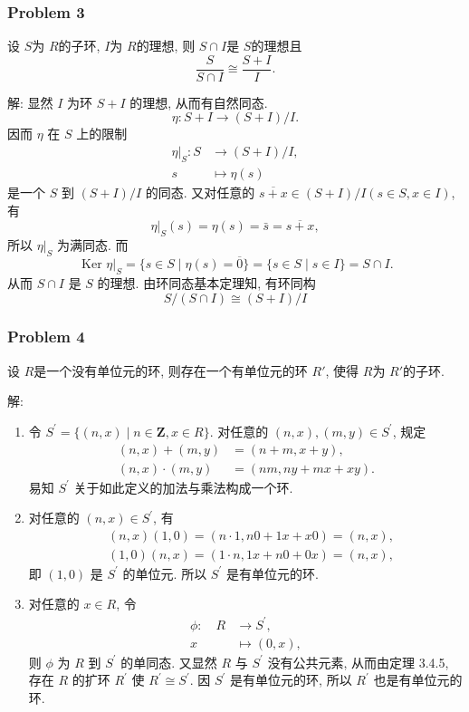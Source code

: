 \documentclass[a4paper,12pt]{ctexart}
\begin{document}
\subsubsection*{Problem 3}
    设 $ S $为 $ R $的子环, $ I $为 $ R $的理想, 则 $ S\cap I $是 $ S $的理想且 
    \[\frac{S}{S\cap I}\cong \frac{S+I}{I}.\]

    解: 
    显然 $I$ 为环 $S+I$ 的理想, 从而有自然同态.
    $$
    \eta: S+I \longrightarrow(S+I) / I .
    $$
    因而 $\eta$ 在 $S$ 上的限制
    $$
    \begin{aligned}
    \left.\eta\right|_S: S & \longrightarrow(S+I) / I, \\
    s & \longmapsto \eta(s)
    \end{aligned}
    $$
    是一个 $S$ 到 $(S+I) / I$ 的同态.
    又对任意的 $\overline{s+x} \in(S+I) / I(s \in S, x \in I)$, 有
    $$
    \left.\eta\right|_S(s)=\eta(s)=\bar{s}=\overline{s+x},
    $$
    所以 $\left.\eta\right|_S$ 为满同态. 而
    $$
    \text { Ker }\left.\eta\right|_S=\{s \in S \mid \eta(s)=\overline{0}\}=\{s \in S \mid s \in I\}=S \cap I .
    $$
    从而 $S \cap I$ 是 $S$ 的理想. 由环同态基本定理知, 有环同构
    $$
    S /(S \cap I) \cong(S+I) / I
    $$

\subsubsection*{Problem 4}
    设 $ R $是一个没有单位元的环, 则存在一个有单位元的环 $ R' $, 使得 $ R $为 $ R' $的子环.
    
    解: 
    \begin{enumerate}[label=(\arabic{*})]
      \item  令 $S^{\prime}=\{(n, x) \mid n \in \mathbf{Z}, x \in R\}$. 对任意的 $(n, x),(m, y) \in S^{\prime}$, 规定
$$
\begin{aligned}
(n, x)+(m, y) &=(n+m, x+y), \\
(n, x) \cdot(m, y) &=(n m, n y+m x+x y) .
\end{aligned}
$$
易知 $S^{\prime}$ 关于如此定义的加法与乘法构成一个环.
\item 对任意的 $(n, x) \in S^{\prime}$, 有
$$
\begin{aligned}
&(n, x)(1,0)=(n \cdot 1, n 0+1 x+x 0)=(n, x), \\
&(1,0)(n, x)=(1 \cdot n, 1 x+n 0+0 x)=(n, x),
\end{aligned}
$$
即 $(1,0)$ 是 $S^{\prime}$ 的单位元. 所以 $S^{\prime}$ 是有单位元的环.
\item 对任意的 $x \in R$, 令
$$
\begin{aligned}
\phi: \quad R & \longrightarrow S^{\prime}, \\
x & \longmapsto(0, x),
\end{aligned}
$$
则 $\phi$ 为 $R$ 到 $S^{\prime}$ 的单同态. 又显然 $R$ 与 $S^{\prime}$ 没有公共元素, 从而由定理 3.4.5, 存在 $R$ 的扩环 $R^{\prime}$ 使 $R^{\prime} \cong S^{\prime}$. 因 $S^{\prime}$ 是有单位元的环, 所以 $R^{\prime}$ 也是有单位元的环.
\end{enumerate}
\end{document}
